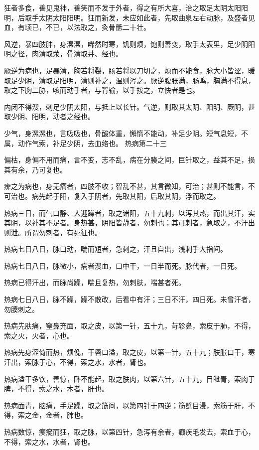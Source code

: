 \documentclass[a4paper,12pt,UTF8,twoside]{ctexbook}
\begin{document}
	狂者多食，善见鬼神，善笑而不发于外者，得之有所大喜，治之取足太阴太阳阳明，后取手太阴太阳阳明。狂而新发，未应如此者，先取曲泉左右动脉，及盛者见血，有顷已，不已，以法取之，灸骨骶二十壮。
	
	风逆，暴四肢肿，身漯漯，唏然时寒，饥则烦，饱则善变，取手太表里，足少阴阳明之径，肉清取荥，骨清取井、经也。
	
	厥逆为病也，足暴清，胸若将裂，肠若将以刀切之，烦而不能食，脉大小皆涩，暖取足少阴，清取足阳明，清则补之，温则泻之。厥逆腹胀满，肠鸣，胸满不得息，取之下胸二胁，咳而动手者，与背输，以手按之，立快者是也。
	
	内闭不得溲，刺足少阴太阳，与抵上以长针。气逆，则取其太阴、阳明、厥阴，甚取少阴、阳明，动者之经也。
	
	少气，身漯漯也，言吸吸也，骨酸体重，懈惰不能动，补足少阴。短气息短，不属，动作气索，补足少阴，去血络也。
	热病第二十三
	
	偏枯，身偏不用而痛，言不变，志不乱，病在分腠之间，巨针取之，益其不足，损其有余，乃可复也。
	
	痱之为病也，身无痛者，四肢不收；智乱不甚，其言微知，可治；甚则不能言，不可治也。病先起于阳，复入于阴者，先取其阳，后取其阴，浮而取之。
	
	热病三日，而气口静、人迎躁者，取之诸阳，五十九刺，以泻其热，而出其汗，实其阴，以补其不足者。身热甚，阴阳皆静者，勿刺也；其可刺者，急取之，不汗出则泄。所谓勿刺者，有死征也。
	
	热病七日八日，脉口动，喘而短者，急刺之，汗且自出，浅刺手大指间。
	
	热病七日八日，脉微小，病者溲血，口中干，一日半而死。脉代者，一日死。
	
	热病已得汗出，而脉尚躁，喘且复热，勿刺肤，喘甚者死。
	
	热病七日八日，脉不躁，躁不散改，后看中有汗；三日不汗，四日死。未曾汗者，勿腠刺之。
	
	热病先肤痛，窒鼻充面，取之皮，以第一针，五十九，苛轸鼻，索皮于肺，不得，索之火，火者，心也。
	
	热病先身涩倚而热，烦俛，干唇口溢，取之皮，以第一针，五十九；肤胀口干，寒汗出，索脉于心，不得，索之水，水者，肾也。
	
	热病溢干多饮，善惊，卧不能起，取之肤肉，以第六针，五十九，目眦青，索肉于脾，不得，索之水，木者，肝也。
	
	热病面青，脑痛，手足躁，取之筋间，以第四针于四逆；筋躄目浸，索筋于肝，不得，索之金，金者，肺也。
	
	热病数惊，瘈瘲而狂，取之脉，以第四针，急泻有余者，癫疾毛发去，索血于心，不得，索之水，水者，肾也。
	
\end{document}
